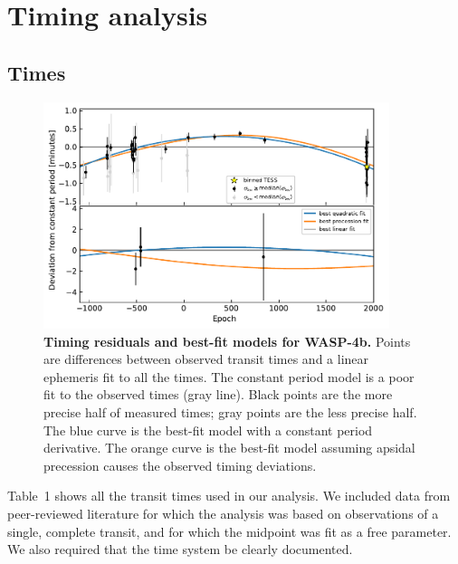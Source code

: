\documentclass[12pt,twocolumn,tighten]{aastex62}
\begin{document}
\section{Timing analysis}
\label{sec:timing}

\subsection{Times}
\label{subsec:times}

\begin{figure}[t]
    \begin{center}
        \leavevmode
        \includegraphics[width=0.9\textwidth]{f3.pdf}
    \end{center}
    \vspace{-0.5cm}
    \caption{
        {\bf Timing residuals and best-fit models for WASP-4b.}
        Points are differences between observed transit times and a
        linear ephemeris fit to all the times.  The constant period
        model is a poor fit to the observed times (gray line).  Black
        points are the more precise half of measured times; gray points
        are the less precise half.  The blue curve is the best-fit model
        with a constant period derivative.  The orange curve is the
        best-fit model assuming apsidal precession causes the observed
        timing deviations.
        \label{fig:times}
    }
\end{figure}

Table~1 shows all the transit times used in our analysis.  We included
data from peer-reviewed literature for which the analysis was based on
observations of a single, complete transit, and for which the midpoint
was fit as a free parameter. We also required that the time system be
clearly documented.
\end{document}
